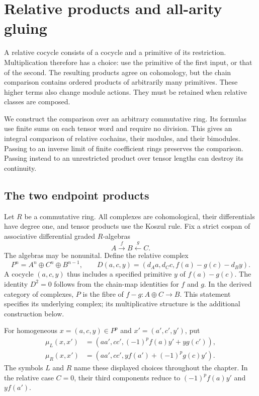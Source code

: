 \chapter{Relative products and all-arity gluing}
\label{v4-arith:gluing:chapter}

A relative cocycle consists of a cocycle and a primitive of its
restriction. Multiplication therefore has a choice: use the primitive
of the first input, or that of the second. The resulting products agree
on cohomology, but the chain comparison contains ordered products of
arbitrarily many primitives. These higher terms also change module
actions. They must be retained when relative classes are composed.

We construct the comparison over an arbitrary commutative ring. Its
formulas use finite sums on each tensor word and require no division.
This gives an integral comparison of relative cochains, their modules,
and their bimodules. Passing to an inverse limit of finite coefficient
rings preserves the comparison. Passing instead to an unrestricted
product over tensor lengths can destroy its continuity.

\section{The two endpoint products}
\label{v4-arith:gluing:sec:products}

Let \(R\) be a commutative ring. All complexes are cohomological, their
differentials have degree one, and tensor products use the Koszul rule.
Fix a strict cospan of associative differential graded \(R\)-algebras
\[
 A\xrightarrow{f}B\xleftarrow{g}C.
\]
The algebras may be nonunital. Define the relative complex
\begin{equation}\label{v4-arith:gluing:eq:complex}
 P^n=A^n\oplus C^n\oplus B^{n-1},\qquad
 D(a,c,y)=(d_Aa,d_Cc,f(a)-g(c)-d_By).
\end{equation}
A cocycle \((a,c,y)\) thus includes a specified primitive \(y\) of
\(f(a)-g(c)\). The identity \(D^2=0\) follows from the chain-map
identities for \(f\) and \(g\). In the derived category of complexes,
\(P\) is the fibre of \(f-g:A\oplus C\to B\). This statement specifies
its underlying complex; its multiplicative structure is the additional
construction below.

For homogeneous \(x=(a,c,y)\in P^p\) and \(x'=(a',c',y')\), put
\begin{equation}\label{v4-arith:gluing:eq:products}
 \begin{split}
 \mu_L(x,x')&=(aa',cc',(-1)^pf(a)y'+yg(c')),\\
 \mu_R(x,x')&=(aa',cc',yf(a')+(-1)^pg(c)y').
 \end{split}
\end{equation}
The symbols \(L\) and \(R\) name these displayed choices throughout the
chapter. In the relative case \(C=0\), their third components reduce to
\((-1)^pf(a)y'\) and \(yf(a')\).

